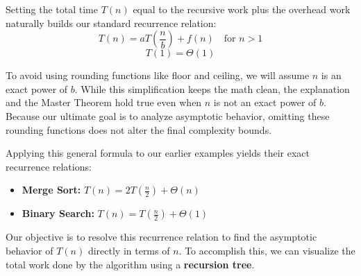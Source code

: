 \documentclass[11pt, a4paper]{article}
\begin{document}
Setting the total time $T(n)$ equal to the recursive work plus the overhead work naturally builds our standard recurrence relation:
\[ T(n) = aT\left(\frac{n}{b}\right) + f(n) \quad \text{for } n > 1 \]
\[ T(1) = \Theta(1) \]

 To avoid using rounding functions like floor and ceiling, we will assume $n$ is an exact power of $b$. While this simplification keeps the math clean, the explanation and the Master Theorem hold true even when $n$ is not an exact power of $b$. Because our ultimate goal is to analyze asymptotic behavior, omitting these rounding functions does not alter the final complexity bounds.

Applying this general formula to our earlier examples yields their exact recurrence relations:
\begin{itemize}
    \item \textbf{Merge Sort:} $T(n) = 2T\left(\frac{n}{2}\right) + \Theta(n)$
    \item \textbf{Binary Search:} $T(n) = T\left(\frac{n}{2}\right) + \Theta(1)$
\end{itemize}

Our objective is to resolve this recurrence relation to find the asymptotic behavior of $T(n)$ directly in terms of $n$. To accomplish this, we can visualize the total work done by the algorithm using a \textbf{recursion tree}.
\end{document}
